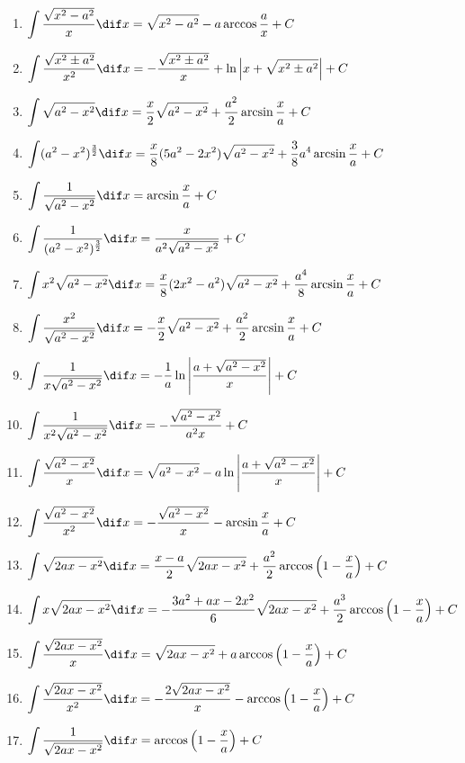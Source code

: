 \begin{enumerate}[1.,itemsep=5pt,resume]
  \item $\displaystyle \int \frac{\sqrt{x^2-a^2}}{x}\dif x =\sqrt{x^2-a^2}-a\arccos\frac{a}{x} +C$
  \item $\displaystyle \int \frac{\sqrt{x^2\pm a^2}}{x^2}\dif x =-\frac{\sqrt{x^2\pm a^2}}{x}+\ln\left|x+\sqrt{x^2\pm a^2}\right| +C$
  \item $\displaystyle \int \sqrt{a^2-x^2}\dif x =\frac{x}{2}\sqrt{a^2-x^2}+\frac{a^2}{2}\arcsin\frac{x}{a} +C$
  \item $\displaystyle \int (a^2-x^2)^{\frac{3}{2}}\dif x =\frac{x}{8}(5a^2-2x^2)\sqrt{a^2-x^2}+\frac{3}{8}a^4\arcsin\frac{x}{a} +C$
  \item $\displaystyle \int \frac{1}{\sqrt{a^2-x^2}}\dif x =\arcsin\frac{x}{a} +C$
  \item $\displaystyle \int \frac{1}{(a^2-x^2)^{\frac{3}{2}}}\dif x =\frac{x}{a^2\sqrt{a^2-x^2}} +C$
  \item $\displaystyle \int x^2\sqrt{a^2-x^2}\dif x =\frac{x}{8}(2x^2-a^2)\sqrt{a^2-x^2}+\frac{a^4}{8}\arcsin\frac{x}{a}+C$
  \item $\displaystyle \int \frac{x^2}{\sqrt{a^2-x^2}}\dif x =-\frac{x}{2}\sqrt{a^2-x^2}+\frac{a^2}{2}\arcsin\frac{x}{a} +C$
  \item $\displaystyle \int \frac{1}{x\sqrt{a^2-x^2}}\dif x =-\frac{1}{a}\ln\left|\frac{a+\sqrt{a^2-x^2}}{x}\right| +C$
  \item $\displaystyle \int \frac{1}{x^2\sqrt{a^2-x^2}}\dif x = -\frac{\sqrt{a^2-x^2}}{a^2x}+C$
  \item $\displaystyle \int \frac{\sqrt{a^2-x^2}}{x}\dif x =\sqrt{a^2-x^2}-a\ln\left|\frac{a+\sqrt{a^2-x^2}}{x}\right| +C$
  \item $\displaystyle \int \frac{\sqrt{a^2-x^2}}{x^2}\dif x =-\frac{\sqrt{a^2-x^2}}{x}-\arcsin\frac{x}{a}+C$
  \item $\displaystyle \int \sqrt{2ax-x^2}\dif x =\frac{x-a}{2}\sqrt{2ax-x^2}+\frac{a^2}{2}\arccos\left(1-\frac{x}{a}\right)+C$
  \item $\displaystyle \int x\sqrt{2ax-x^2}\dif x =-\frac{3a^2+ax-2x^2}{6}\sqrt{2ax-x^2}+\frac{a^3}{2}\arccos\left(1-\frac{x}{a}\right)+C$
  \item $\displaystyle \int \frac{\sqrt{2ax-x^2}}{x}\dif x = \sqrt{2ax-x^2}+a\arccos\left(1-\frac{x}{a}\right)+C$
  \item $\displaystyle \int \frac{\sqrt{2ax-x^2}}{x^2}\dif x = -\frac{2\sqrt{2ax-x^2}}{x}-\arccos\left(1-\frac{x}{a}\right)+C$
  \item $\displaystyle \int \frac{1}{\sqrt{2ax-x^2}}\dif x = \arccos\left(1-\frac{x}{a}\right)+C$

\end{enumerate}
